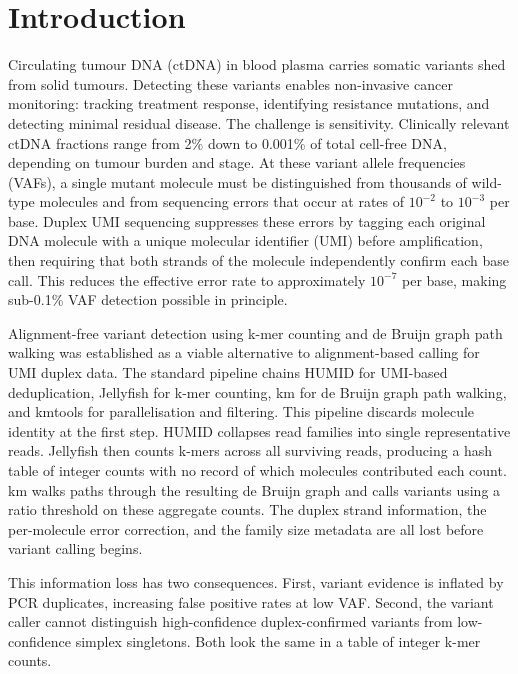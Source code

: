 \section{Introduction}
\label{sec:introduction}

Circulating tumour DNA (ctDNA) in blood plasma carries somatic variants shed from solid tumours.
Detecting these variants enables non-invasive cancer monitoring: tracking treatment response, identifying resistance mutations, and detecting minimal residual disease\autocite{Wan17ctdna}.
The challenge is sensitivity.
Clinically relevant ctDNA fractions range from 2\% down to 0.001\% of total cell-free DNA, depending on tumour burden and stage.
At these variant allele frequencies (VAFs), a single mutant molecule must be distinguished from thousands of wild-type molecules and from sequencing errors that occur at rates of $10^{-2}$ to $10^{-3}$ per base.
Duplex UMI sequencing suppresses these errors by tagging each original DNA molecule with a unique molecular identifier (UMI) before amplification, then requiring that both strands of the molecule independently confirm each base call\autocite{Schmitt12duplex, Kennedy14duplex}.
This reduces the effective error rate to approximately $10^{-7}$ per base, making sub-0.1\% VAF detection possible in principle.

Alignment-free variant detection using k-mer counting and de Bruijn graph path walking was established as a viable alternative to alignment-based calling for UMI duplex data.
The standard pipeline chains HUMID for UMI-based deduplication\autocite{Langedijk22humid}, Jellyfish for k-mer counting\autocite{Marcais11jellyfish}, km for de Bruijn graph path walking\autocite{Bourgey19km}, and kmtools for parallelisation and filtering.
This pipeline discards molecule identity at the first step.
HUMID collapses read families into single representative reads.
Jellyfish then counts k-mers across all surviving reads, producing a hash table of integer counts with no record of which molecules contributed each count.
km walks paths through the resulting de Bruijn graph and calls variants using a ratio threshold on these aggregate counts.
The duplex strand information, the per-molecule error correction, and the family size metadata are all lost before variant calling begins.

This information loss has two consequences.
First, variant evidence is inflated by PCR duplicates, increasing false positive rates at low VAF.
Second, the variant caller cannot distinguish high-confidence duplex-confirmed variants from low-confidence simplex singletons.
Both look the same in a table of integer k-mer counts.

